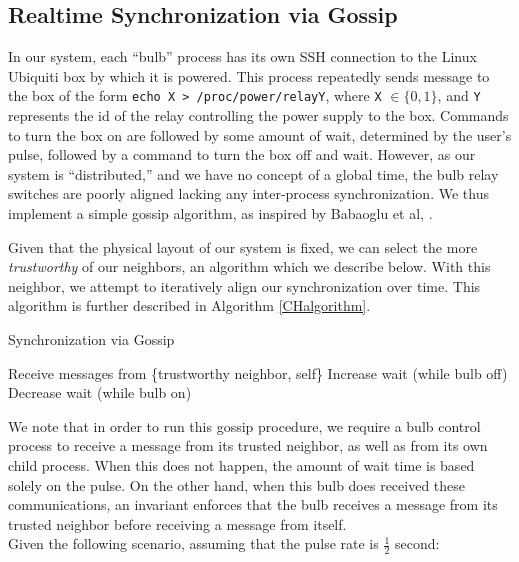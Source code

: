 \documentclass[preprint,review,12pt]{cs262}
\begin{document}
\subsection{Realtime Synchronization via Gossip}

In our system, each ``bulb'' process has its own SSH connection to the Linux Ubiquiti box by which it is powered. This process repeatedly sends message to the box of the form \texttt{echo X > /proc/power/relayY}, where \texttt{X} $\in \{0,1\}$, and \texttt{Y} represents the id of the relay controlling the power supply to the box. Commands to turn the box on are followed by some amount of wait, determined by the user's pulse, followed by a command to turn the box off and wait. However, as our system is ``distributed,'' and we have no concept of a global time, the bulb relay switches are poorly aligned lacking any inter-process synchronization. We thus implement a simple gossip algorithm, as inspired by Babaoglu et al, \cite{babaoglu2007firefly}. 

Given that the physical layout of our system is fixed, we can select the more \emph{trustworthy} of our neighbors, an algorithm which we describe below. With this neighbor, we attempt to iteratively align our synchronization over time. This algorithm is further described in Algorithm \ref{CHalgorithm}. 

\begin{algorithm}
\caption{Synchronization via Gossip}
\label{CHalgorithm}
\begin{algorithmic}[1]
\State Receive messages from \{trustworthy neighbor, self\}
\State Increase wait (while bulb off)
\Else
\State Decrease wait (while bulb on)
\EndIf
\EndWhile
\EndProcedure
\end{algorithmic}
\end{algorithm}

We note that in order to run this gossip procedure, we require a bulb control process to receive a message from its trusted neighbor, as well as from its own child process. When this does not happen, the amount of wait time is based solely on the pulse. On the other hand, when this bulb does received these communications, an invariant enforces that the bulb receives a message from its trusted neighbor before receiving a message from itself. 
\\

Given the following scenario, assuming that the pulse rate is $\frac{1}{2}$ second: 
\end{document}
